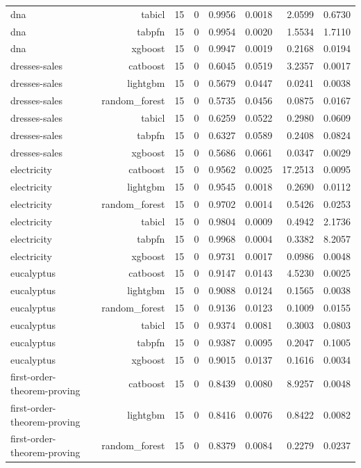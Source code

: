 \begin{table}[htbp]
\begin{tabular}{lrrrrrrr}
dna & tabicl & 15 & 0 & 0.9956 & 0.0018 & 2.0599 & 0.6730 \\
dna & tabpfn & 15 & 0 & 0.9954 & 0.0020 & 1.5534 & 1.7110 \\
dna & xgboost & 15 & 0 & 0.9947 & 0.0019 & 0.2168 & 0.0194 \\
dresses-sales & catboost & 15 & 0 & 0.6045 & 0.0519 & 3.2357 & 0.0017 \\
dresses-sales & lightgbm & 15 & 0 & 0.5679 & 0.0447 & 0.0241 & 0.0038 \\
dresses-sales & random\_forest & 15 & 0 & 0.5735 & 0.0456 & 0.0875 & 0.0167 \\
dresses-sales & tabicl & 15 & 0 & 0.6259 & 0.0522 & 0.2980 & 0.0609 \\
dresses-sales & tabpfn & 15 & 0 & 0.6327 & 0.0589 & 0.2408 & 0.0824 \\
dresses-sales & xgboost & 15 & 0 & 0.5686 & 0.0661 & 0.0347 & 0.0029 \\
electricity & catboost & 15 & 0 & 0.9562 & 0.0025 & 17.2513 & 0.0095 \\
electricity & lightgbm & 15 & 0 & 0.9545 & 0.0018 & 0.2690 & 0.0112 \\
electricity & random\_forest & 15 & 0 & 0.9702 & 0.0014 & 0.5426 & 0.0253 \\
electricity & tabicl & 15 & 0 & 0.9804 & 0.0009 & 0.4942 & 2.1736 \\
electricity & tabpfn & 15 & 0 & 0.9968 & 0.0004 & 0.3382 & 8.2057 \\
electricity & xgboost & 15 & 0 & 0.9731 & 0.0017 & 0.0986 & 0.0048 \\
eucalyptus & catboost & 15 & 0 & 0.9147 & 0.0143 & 4.5230 & 0.0025 \\
eucalyptus & lightgbm & 15 & 0 & 0.9088 & 0.0124 & 0.1565 & 0.0038 \\
eucalyptus & random\_forest & 15 & 0 & 0.9136 & 0.0123 & 0.1009 & 0.0155 \\
eucalyptus & tabicl & 15 & 0 & 0.9374 & 0.0081 & 0.3003 & 0.0803 \\
eucalyptus & tabpfn & 15 & 0 & 0.9387 & 0.0095 & 0.2047 & 0.1005 \\
eucalyptus & xgboost & 15 & 0 & 0.9015 & 0.0137 & 0.1616 & 0.0034 \\
first-order-theorem-proving & catboost & 15 & 0 & 0.8439 & 0.0080 & 8.9257 & 0.0048 \\
first-order-theorem-proving & lightgbm & 15 & 0 & 0.8416 & 0.0076 & 0.8422 & 0.0082 \\
first-order-theorem-proving & random\_forest & 15 & 0 & 0.8379 & 0.0084 & 0.2279 & 0.0237 \\

\end{tabular}
\end{table}
